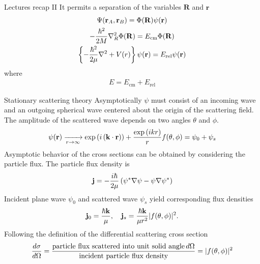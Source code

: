 \documentclass[10pt,pdf,hyperref={unicode}]{beamer}
\newcommand{\lb}{\left(}
\newcommand{\rb}{\right)}
\begin{document}
\begin{frame}{Lectures recap II}
	It permits a separation of the variables $\mathbf{R}$ and $\mathbf{r}$
	\begin{gather}
		\Psi(\mathbf{r}_A, \mathbf{r}_B) = \Phi(\mathbf{R}) \psi(\mathbf{r}) \notag \\
		-\frac{\hbar^2}{2M} \nabla^2_R \Phi(\mathbf{R}) = E_\text{cm} \Phi(\mathbf{R}) \notag \\
		\left\{ -\frac{\hbar^2}{2\mu} \nabla^2 + V(r) \right\} \psi(\mathbf{r}) = E_\text{rel} \psi(\mathbf{r})
	\end{gather}
	where 
	\begin{gather}
		E = E_\text{cm} + E_\text{rel}
	\end{gather}
\end{frame}

\begin{frame}{Stationary scattering theory}
	Asymptotically $\psi$ must consist of an incoming wave and an outgoing spherical wave centered about the origin of the scattering field. The amplitude of the scattered wave depends on two angles $\theta$ and $\phi$. 
	\begin{gather}
			\psi(\mathbf{r}) \xrightarrow[r \rightarrow \infty]{} \exp \lb i \lb \mathbf{k} \cdot \mathbf{r} \rb \rb + \frac{\exp \lb i k r \rb}{r} f(\theta, \phi) = \psi_0 + \psi_s \notag
	\end{gather}
	Asymptotic behavior of the cross sections can be obtained by considering the particle flux. The particle flux density is
	\begin{gather}
		\mathbf{j} = -\frac{i \hbar}{2 \mu} \lb \psi^* \nabla \psi - \psi \nabla \psi^* \rb \notag
	\end{gather}
	Incident plane wave $\psi_0$ and scattered wave $\psi_s$ yield corresponding flux densities
	\begin{gather}
		\mathbf{j}_0 = \frac{\hbar \mathbf{k}}{\mu}, \quad
		\mathbf{j}_s  = \frac{\hbar \mathbf{k}}{\mu r^2} | f(\theta, \phi) |^2. \notag
	\end{gather}
	Following the definition of the differential scattering cross section
	\begin{gather}
			\frac{d\sigma}{d \Omega} = \frac{\text{particle flux scattered into unit solid angle} \, d\Omega}{\text{incident particle flux density}} = |f(\theta, \phi)|^2 \notag
	\end{gather}
\end{frame}
\end{document}
